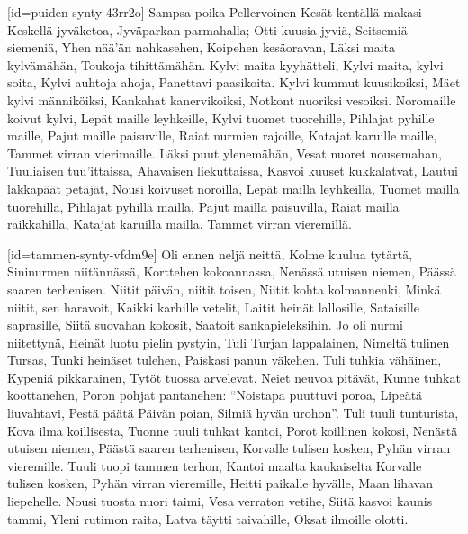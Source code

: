 [id={puiden-synty-43rr2o}]
  \beginverse
    Sampsa poika Pellervoinen
    Kesät kentällä makasi
    Keskellä jyväketoa,
    Jyväparkan parmahalla;
    Otti kuusia jyviä,
    Seitsemiä siemeniä,
    Yhen nää'än nahkasehen,
    Koipehen kesäoravan,
    Läksi maita kylvämähän,
    Toukoja tihittämähän.
  \endverse
  \beginverse
    Kylvi maita kyyhätteli,
    Kylvi maita, kylvi soita,
    Kylvi auhtoja ahoja,
    Panettavi paasikoita.
    Kylvi kummut kuusikoiksi,
    Mäet kylvi männiköiksi,
    Kankahat kanervikoiksi,
    Notkont nuoriksi vesoiksi.
    Noromaille koivut kylvi,
    Lepät maille leyhkeille,
    Kylvi tuomet tuorehille,
    Pihlajat pyhille maille,
    Pajut maille paisuville,
    Raiat nurmien rajoille,
    Katajat karuille maille,
    Tammet virran vierimaille.
  \endverse
  \beginverse
    Läksi puut ylenemähän,
    Vesat nuoret nousemahan,
    Tuuliaisen tuu'ittaissa,
    Ahavaisen liekuttaissa,
    Kasvoi kuuset kukkalatvat,
    Lautui lakkapäät petäjät,
    Nousi koivuset noroilla,
    Lepät mailla leyhkeillä,
    Tuomet mailla tuorehilla,
    Pihlajat pyhillä mailla,
    Pajut mailla paisuvilla,
    Raiat mailla raikkahilla,
    Katajat karuilla mailla,
    Tammet virran vieremillä.
  \endverse
\endsong


[id={tammen-synty-vfdm9e}]
  \beginverse
    Oli ennen neljä neittä,
    Kolme kuulua tytärtä,
    Sininurmen niitännässä,
    Korttehen kokoannassa,
    Nenässä utuisen niemen,
    Päässä saaren terhenisen.
    Niitit päivän, niitit toisen,
    Niitit kohta kolmannenki,
    Minkä niitit, sen haravoit,
    Kaikki karhille vetelit,
    Laitit heinät lallosille,
    Sataisille saprasille,
    Siitä suovahan kokosit,
    Saatoit sankapieleksihin.
  \endverse
  \beginverse
    Jo oli nurmi niitettynä,
    Heinät luotu pielin pystyin,
    Tuli Turjan lappalainen,
    Nimeltä tulinen Tursas,
    Tunki heinäset tulehen,
    Paiskasi panun väkehen.
  \endverse
  \beginverse
    Tuli tuhkia vähäinen,
    Kypeniä pikkarainen,
    Tytöt tuossa arvelevat,
    Neiet neuvoa pitävät,
    Kunne tuhkat koottanehen,
    Poron pohjat pantanehen:
    ``Noistapa puuttuvi poroa,
    Lipeätä liuvahtavi,
    Pestä päätä Päivän poian,
    Silmiä hyvän urohon''.
  \endverse
  \beginverse
    Tuli tuuli tunturista,
    Kova ilma koillisesta,
    Tuonne tuuli tuhkat kantoi,
    Porot koillinen kokosi,
    Nenästä utuisen niemen,
    Päästä saaren terhenisen,
    Korvalle tulisen kosken,
    Pyhän virran vieremille.
    Tuuli tuopi tammen terhon,
    Kantoi maalta kaukaiselta
    Korvalle tulisen kosken,
    Pyhän virran vieremille,
    Heitti paikalle hyvälle,
    Maan lihavan liepehelle.
    Nousi tuosta nuori taimi,
    Vesa verraton vetihe,
    Siitä kasvoi kaunis tammi,
    Yleni rutimon raita,
    Latva täytti taivahille,
    Oksat ilmoille olotti.
  \endverse
\endsong


